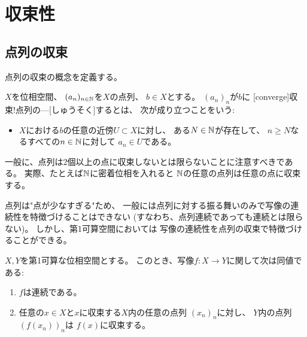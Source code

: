 \documentclass[report]{jlreq}
\begin{document}
%
\chapter{収束性}

%
\section{点列の収束}

点列の収束の概念を定義する。

\begin{definition}[点列の収束]
    $X$を位相空間、
    $(a_n)_{n \in \mathbb{N}}$を$X$の点列、
    $b \in X$とする。
    $(a_n)_n$が$b$に
    [converge]{収束!点列の---}[しゅうそく]するとは、
    次が成り立つことをいう:
    \begin{itemize}
        \item $X$における$b$の任意の近傍$U \subset X$に対し、
            ある$N \in \mathbb{N}$が存在して、
            $n \ge N$なるすべての$n \in \mathbb{N}$に対して
            $a_n \in U$である。
    \end{itemize}
\end{definition}

\begin{remark}
    一般に、点列は2個以上の点に収束しないとは限らないことに注意すべきである。
    実際、たとえば$\mathbb{N}$に密着位相を入れると
    $\mathbb{N}$の任意の点列は任意の点に収束する。
\end{remark}

点列は"点が少なすぎる"ため、
一般には点列に対する振る舞いのみで写像の連続性を特徴づけることはできない
(すなわち、点列連続であっても連続とは限らない)。
しかし、第1可算空間においては
写像の連続性を点列の収束で特徴づけることができる。

\begin{proposition}[連続写像の特徴付け]
    $X, Y$を第1可算な位相空間とする。
    このとき、写像$f \colon X \to Y$に関して次は同値である:
    \begin{enumerate}
        \item $f$は連続である。
        \item 任意の$x \in X$と$x$に収束する$X$内の任意の点列
            $(x_n)_n$に対し、
            $Y$内の点列$(f(x_n))_n$は
            $f(x)$に収束する。
    \end{enumerate}
\end{proposition}
\end{document}
